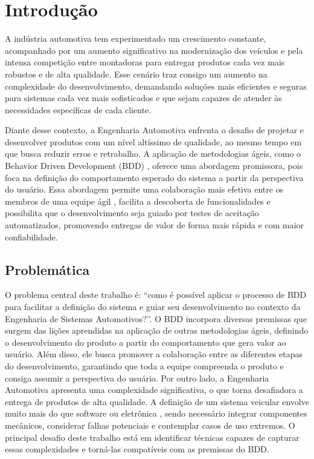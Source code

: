 \chapter{Introdução}

A indústria automotiva tem experimentado um crescimento constante, acompanhado por um aumento significativo na modernização dos veículos e pela intensa competição entre 
montadoras para entregar produtos cada vez mais robustos e de alta qualidade. Esse cenário traz consigo um aumento na complexidade do desenvolvimento, demandando soluções 
mais eficientes e seguras para sistemas cada vez mais sofisticados e que sejam capazes de atender às necessidades específicas de cada cliente.

Diante desse contexto, a Engenharia Automotiva enfrenta o desafio de projetar e desenvolver produtos com um nível altíssimo de qualidade, ao mesmo tempo em que busca reduzir 
erros e retrabalho. A aplicação de metodologias ágeis, como o Behavior Driven Development (BDD) \cite{north2006bdd}, oferece uma abordagem promissora, pois foca na definição 
do comportamento esperado do sistema a partir da perspectiva do usuário. Essa abordagem permite uma colaboração mais efetiva entre os membros de uma equipe ágil 
\cite{atlassianAgileTeams}, facilita a descoberta de funcionalidades e possibilita que o desenvolvimento seja guiado por testes de aceitação automatizados, promovendo entregas de valor de forma 
mais rápida e com maior confiabilidade.

\section{Problemática}

O problema central deste trabalho é: “como é possível aplicar o processo de BDD para facilitar a definição do sistema e guiar seu desenvolvimento no contexto da 
Engenharia de Sistemas Automotivos?”.
O BDD incorpora diversas premissas que surgem das lições aprendidas na aplicação de outras metodologias ágeis, definindo o desenvolvimento do produto a partir do 
comportamento que gera valor ao usuário. Além disso, ele busca promover a colaboração entre as diferentes etapas do desenvolvimento, garantindo que toda a equipe 
compreenda o produto e consiga assumir a perspectiva do usuário.
Por outro lado, a Engenharia Automotiva apresenta uma complexidade significativa, o que torna desafiadora a entrega de produtos de alta qualidade. A definição de 
um sistema veicular envolve muito mais do que software ou eletrônica \cite{bosch2022handbook}, sendo necessário integrar componentes mecânicos, considerar falhas 
potenciais e contemplar casos de uso extremos.
O principal desafio deste trabalho está em identificar técnicas capazes de capturar essas complexidades e torná-las compatíveis com as premissas do BDD.


